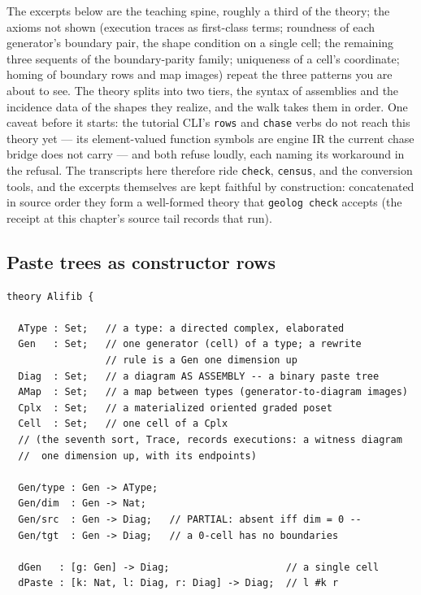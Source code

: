 \noindent The excerpts below are the teaching spine, roughly a third
of the theory; the axioms not shown (execution traces as first-class
terms; roundness of each generator's boundary pair, the shape
condition on a single cell; the remaining three sequents of the
boundary-parity family; uniqueness of a cell's coordinate; homing of
boundary rows and map images) repeat the three patterns you are about
to see. The theory splits into two tiers, the syntax of assemblies
and the incidence data of the shapes they realize, and the walk takes
them in order. One caveat before it starts: the tutorial CLI's
\texttt{rows} and \texttt{chase} verbs do not reach this theory yet
--- its element-valued function symbols are engine IR the current
chase bridge does not carry --- and both refuse loudly, each naming
its workaround in the refusal. The transcripts here therefore ride
\texttt{check}, \texttt{census}, and the conversion tools, and the
excerpts themselves are kept faithful by construction: concatenated in
source order they form a well-formed theory that \texttt{geolog check}
accepts (the receipt at this chapter's source tail records that run).

\subsection{Paste trees as constructor rows}
\label{sec:gt-alifib-tier1}

\begin{Verbatim}[fontsize=\small,frame=leftline,rulecolor=\color{accentmid},framesep=3mm,xleftmargin=3mm]
theory Alifib {

  AType : Set;   // a type: a directed complex, elaborated
  Gen   : Set;   // one generator (cell) of a type; a rewrite
                 // rule is a Gen one dimension up
  Diag  : Set;   // a diagram AS ASSEMBLY -- a binary paste tree
  AMap  : Set;   // a map between types (generator-to-diagram images)
  Cplx  : Set;   // a materialized oriented graded poset
  Cell  : Set;   // one cell of a Cplx
  // (the seventh sort, Trace, records executions: a witness diagram
  //  one dimension up, with its endpoints)

  Gen/type : Gen -> AType;
  Gen/dim  : Gen -> Nat;
  Gen/src  : Gen -> Diag;   // PARTIAL: absent iff dim = 0 --
  Gen/tgt  : Gen -> Diag;   // a 0-cell has no boundaries

  dGen   : [g: Gen] -> Diag;                    // a single cell
  dPaste : [k: Nat, l: Diag, r: Diag] -> Diag;  // l #k r
\end{Verbatim}

